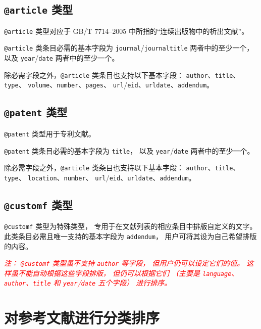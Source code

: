 \documentclass[UTF8]{ctexart}
\newcommand{\myemph}[1]{\emph{\textcolor{red}{#1}}}
\begin{document}
\subsection{\texttt{@article} 类型}

\verb|@article| 类型对应于 GB/T 7714--2005 中所指的“连续出版物中的析出文献”。

\verb|@article| 类条目必需的基本字段为
\verb|journal|/\verb|journaltitle| 两者中的至少一个，
以及 \verb|year|/\verb|date| 两者中的至少一个。

除必需字段之外，\verb|@article| 类条目也支持以下基本字段：%
\verb|author|、\verb|title|、\verb|type|、%
\verb|volume|、\verb|number|、\verb|pages|、%
\verb|url|/\verb|eid|、\verb|urldate|、\verb|addendum|。

\subsection{\texttt{@patent} 类型}

\verb|@patent| 类型用于专利文献。

\verb|@patent| 类条目必需的基本字段为 \verb|title|，
以及 \verb|year|/\verb|date| 两者中的至少一个。

除必需字段之外，\verb|@article| 类条目也支持以下基本字段：%
\verb|author|、\verb|title|、\verb|type|、%
\verb|location|、\verb|number|、%
\verb|url|/\verb|eid|、\verb|urldate|、\verb|addendum|。

\subsection{\texttt{@customf} 类型}

\verb|@customf| 类型为特殊类型，
专用于在文献列表的相应条目中排版自定义的文字。
此类条目必需且唯一支持的基本字段为 \verb|addendum|，
用户可将其设为自己希望排版的内容。

\myemph{%
	注：%
	\texttt{@customf} 类型虽不支持 \texttt{author} 等字段，
	但用户仍可以设定它们的值。
	这样虽不能自动根据这些字段排版，
	但仍可以根据它们
	（主要是 \texttt{language}、\texttt{author}、\texttt{title}
	和 \texttt{year}/\texttt{date} 五个字段）
	进行排序。 %
}

\section{对参考文献进行分类排序}\label{sec:catsort}
\end{document}

